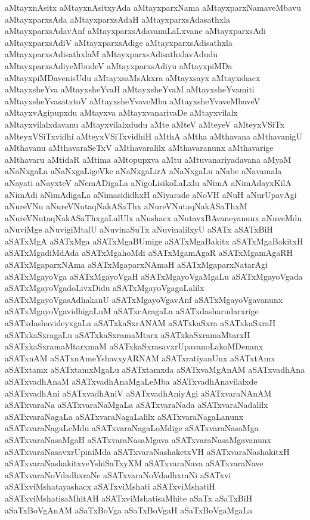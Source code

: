 {aMtayxnAsitx
aMtayxnAsitxyAda
aMtayxparxNama
aMtayxparxNamaveMbavu
aMtayxparxsAda
aMtayxparxsAdaH
aMtayxparxsAdasathxla
aMtayxparxsAdavAnf
aMtayxparxsAdavanuLaLxvane
aMtayxparxsAdi
aMtayxparxsAdiV
aMtayxparxsAdige
aMtayxparxsAdisathxla
aMtayxparxsAdisathxlaM
aMtayxparxsAdisathxlavAdudu
aMtayxparxsAdiyeMbudeV
aMtayxparxsAdiyu
aMtayxpiMDa
aMtayxpiMDavenisUdu
aMtayxsaMsAkxra
aMtayxsayx
aMtayxshacx
aMtayxsheYva
aMtayxsheYvaH
aMtayxsheYvaM
aMtayxsheYvamiti
aMtayxsheYvasatxtoV
aMtayxsheYvaveMba
aMtayxsheYvaveMbaveV
aMtayxvAgipupxdu
aMtayxva
aMtayxvanarivaDe
aMtayxvilalx
aMtayxvilalxdavanu
aMtayxvilalxdudu
aMte
aMteV
aMteyeV
aMteyxVSiTx
aMteyxVSiTxvidhi
aMteyxVSiTxvidhiH
aMthA
aMtha
aMthavana
aMthavanigU
aMthavanu
aMthavaraSeTxV
aMthavaralilx
aMthavaranunx
aMthavarige
aMthavaru
aMtidaR
aMtima
aMtopupxva
aMtu
aMtuvanariyadavana
aMyaM
aNaNxgaLa
aNaNxgaLigeVke
aNaNxgaLirA
aNaNxgaLu
aNabe
aNavamala
aNayati
aNayxteV
aNemADigaLa
aNigoLisikoLaLxlu
aNimA
aNimAdayxKilA
aNimAdi
aNimAdigaLa
aNimasididhxH
aNiyarade
aNoVH
aNuH
aNurUpavAgi
aNureVNu
aNureVNutaqNakASaThx
aNureVNutaqNakASaThxM
aNureVNutaqNakASaThxgaLalUlx
aNushacx
aNutavxBAvaneyanunx
aNuveMdu
aNuviMge
aNuvigiMtalU
aNuvinaSuTx
aNuvinalilxyU
aSATx
aSATxBiH
aSATxMgA
aSATxMga
aSATxMgaBUmige
aSATxMgaBakitx
aSATxMgaBakitxH
aSATxMgadiMdAda
aSATxMgahoMdi
aSATxMgamAgaR
aSATxMgamAgaRH
aSATxMgaparxNAma
aSATxMgaparxNAmaH
aSATxMgaparxNatarAgi
aSATxMgayoVga
aSATxMgayoVgaH
aSATxMgayoVgaMgaLu
aSATxMgayoVgada
aSATxMgayoVgadoLivxDidu
aSATxMgayoVgagaLalilx
aSATxMgayoVgasAdhakanU
aSATxMgayoVgavAnf
aSATxMgayoVgavanunx
aSATxMgayoVgavidhigaLuM
aSATxcAragaLa
aSATxdasharudarxrige
aSATxdashavideyxgaLa
aSATxkaSxrANAM
aSATxkaSxra
aSATxkaSxraH
aSATxkaSxragaLu
aSATxkaSxramaMtarx
aSATxkaSxramaMtarxH
aSATxkaSxramaMtarxmaM
aSATxkaSxrasavxrUpavanoLakoMDenanx
aSATxnAM
aSATxnAmeYshavxyARNAM
aSATxratiyanUnx
aSATxtAmx
aSATxtamx
aSATxtamxMgaLu
aSATxtamxda
aSATxvaMgAnAM
aSATxvadhAna
aSATxvadhAnaM
aSATxvadhAnaMgaLeMba
aSATxvadhAnavilalxde
aSATxvadhAni
aSATxvadhAniV
aSATxvadhAniyAgi
aSATxvaraNAnAM
aSATxvaraNa
aSATxvaraNaMgaLa
aSATxvaraNada
aSATxvaraNadalilx
aSATxvaraNagaLa
aSATxvaraNagaLalilx
aSATxvaraNagaLanunx
aSATxvaraNagaLeMdu
aSATxvaraNagaLoMdige
aSATxvaraNasaMga
aSATxvaraNasaMgaH
aSATxvaraNasaMgava
aSATxvaraNasaMgavanunx
aSATxvaraNasavxrUpiniMda
aSATxvaraNashaketxVH
aSATxvaraNashakitxH
aSATxvaraNashakitxveYshiSaTxyXM
aSATxvaraNava
aSATxvaraNave
aSATxvaraNoVdadhxraNe
aSATxvaraNoVdadhxraNi
aSATxvi
aSATxviMshatayashacx
aSATxviMshati
aSATxviMshatiH
aSATxviMshatisaMhitAH
aSATxviMshatisaMhite
aSaTx
aSaTxBiH
aSaTxBoVgAnAM
aSaTxBoVga
aSaTxBoVgaH
aSaTxBoVgaMgaLa
}
